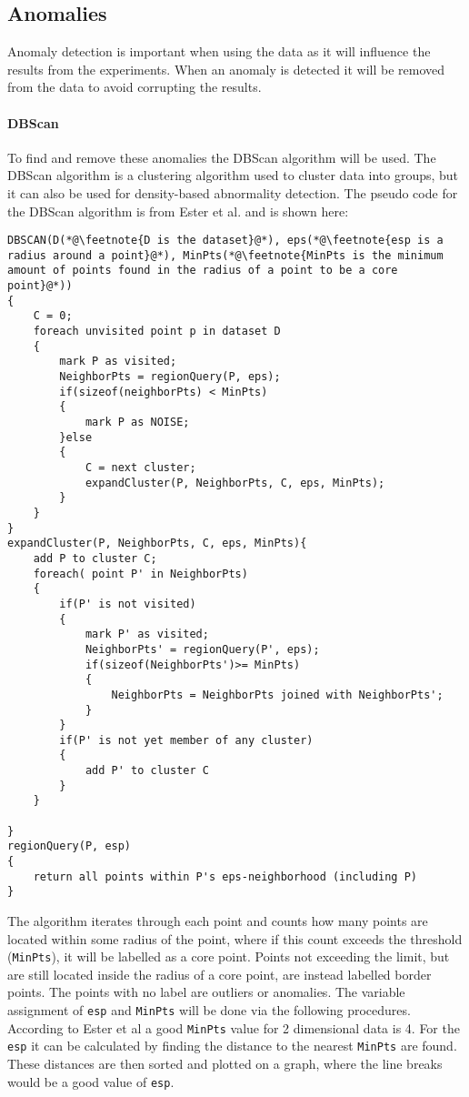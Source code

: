 \subsection{Anomalies}
Anomaly detection is important when using the data as it will influence the results from the experiments. When an anomaly is detected it will be removed from the data to avoid corrupting the results.
\paragraph{DBScan}
To find and remove these anomalies the DBScan algorithm will be used. The DBScan algorithm is a clustering algorithm used to cluster data into groups, but it can also be used for density-based abnormality detection. The pseudo code for the DBScan algorithm is from Ester et al.\cite{ester1996density} and is shown here:
\begin{lstlisting}
DBSCAN(D(*@\feetnote{D is the dataset}@*), eps(*@\feetnote{esp is a radius around a point}@*), MinPts(*@\feetnote{MinPts is the minimum amount of points found in the radius of a point to be a core point}@*))
{
    C = 0;
    foreach unvisited point p in dataset D
    {
        mark P as visited;
        NeighborPts = regionQuery(P, eps);
        if(sizeof(neighborPts) < MinPts)
        {
            mark P as NOISE;
        }else
        {
            C = next cluster;
            expandCluster(P, NeighborPts, C, eps, MinPts);
        }
    }
}
expandCluster(P, NeighborPts, C, eps, MinPts){
    add P to cluster C;
    foreach( point P' in NeighborPts)
    {
        if(P' is not visited)
        {
            mark P' as visited;
            NeighborPts' = regionQuery(P', eps);
            if(sizeof(NeighborPts')>= MinPts)
            {
                NeighborPts = NeighborPts joined with NeighborPts';
            }
        }
        if(P' is not yet member of any cluster)
        {
            add P' to cluster C
        }
    }

}
regionQuery(P, esp)
{
    return all points within P's eps-neighborhood (including P)
}
\end{lstlisting}

The algorithm iterates through each point and counts how many points are located within some radius of the point, where if this count exceeds the threshold (\texttt{MinPts}), it will be labelled as a core point. Points not exceeding the limit, but are still located inside the radius of a core point, are instead labelled border points. The points with no label are outliers or anomalies. The variable assignment of \texttt{esp} and \texttt{MinPts} will be done via the following procedures. According to Ester et al\cite[]{ester1996density} a good \texttt{MinPts} value for 2 dimensional data is 4. For the \texttt{esp} it can be calculated by finding the distance to the nearest \texttt{MinPts} are found. These distances are then sorted and plotted on a graph, where the line breaks would be a good value of \texttt{esp}.


